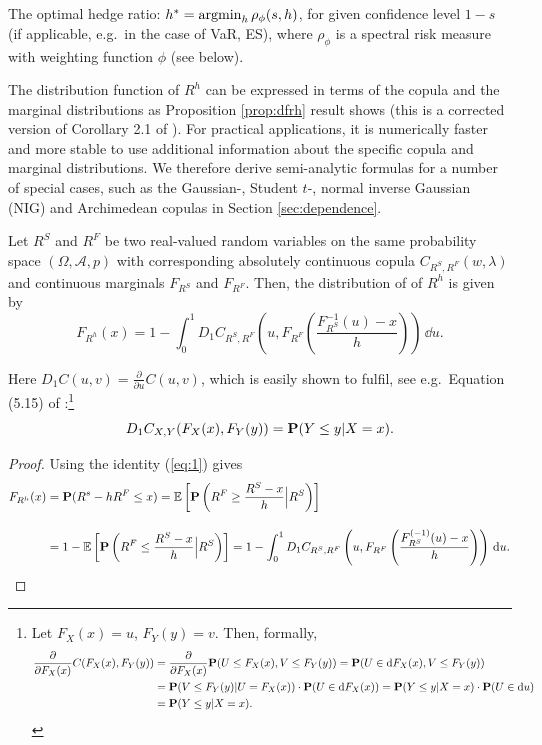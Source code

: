 \documentclass[11pt,a4paper,english]{article}
\begin{document}
The optimal hedge ratio: $h^\ast = \argmin_h \rho_\phi(s,h)$, for given
confidence level $1-s$ (if applicable, e.g.\ in the case of VaR, ES),
where $\rho_\phi$ is a spectral risk measure with weighting function
$\phi$ (see below).

The distribution function of $R^h$ can be expressed in terms of the
copula and the marginal distributions as Proposition \ref{prop:dfrh}
result shows (this is a corrected version of Corollary 2.1 of
\citep{Barbi2014}). For practical applications, it is numerically
faster and more stable to use additional information about the
specific copula and marginal distributions. We therefore derive
semi-analytic formulas for a number of special cases, such as the
Gaussian-, Student $t$-, normal inverse Gaussian (NIG) and Archimedean
copulas in Section \ref{sec:dependence}.

\begin{proposition}
  \label{prop:dfrh}
  Let $R^S$ and $R^F$ be two real-valued random variables on the same
  probability space $(\Omega, \mathcal A, p)$ with corresponding
  absolutely continuous copula $C_{R^S, R^F}(w,\lambda)$ and
  continuous marginals $F_{R^S}$ and $F_{R^F}$. Then, the distribution
  of of $R^h$ is given by
  \begin{equation}
    \label{eq:3}
    F_{R^h}(x) = 1- \int^1_0 D_1 C_{R^S, R^F}
    \left( u, F_{R^F} \left( \frac{F^{-1}_{R^S}(u)-x}{h} \right)
    \right)\, \dd u.
  \end{equation}
\end{proposition}\medskip
Here $D_1 C(u,v)=\displaystyle \frac{\partial}{\partial u} C(u,v)$,
which is easily shown to fulfil, see e.g.\ Equation (5.15) of
\citep{McNeil2005}:\footnote{%
  Let $F_X(x)=u$, $F_Y(y)=v$. Then, formally,
  \begin{align*}
    \frac{\partial}{\partial F_X(x)} C(F_X(x), F_Y(y)) %
    &= \frac{\partial}{\partial F_X(x)} \p(U\leq F_X(x),
      V\leq F_Y(y)) %
      = \p(U\in \dd F_X(x), V\leq F_Y(y))\\ %
    &= \p(V\leq F_Y(y)| U = F_X(x))\cdot \p(U \in \dd
      F_X(x)) %
      = \p(Y\leq y|X=x)\cdot \p(U\in \dd u)\\ %
    &= \p(Y\leq y|X=x).
  \end{align*}}
\begin{equation}
  \label{eq:1}
  D_1 C_{X,Y}(F_X(x), F_Y(y)) = {\bf P}(Y\leq y|X=x).
\end{equation}
\begin{proof}
  Using the identity (\ref{eq:1}) gives
  \begin{align*}
    F_{R^h}(x) &= \p(R^s - h R^F\leq x) %
                 = \E\left[\p\left(R^F\geq \frac{R^S-x}{h}\Big|
                 R^S\right)\right]\\[10pt]
               &= 1-\E\left[\p\left(R^F\leq \frac{R^S-x}{h}\Big|
                 R^S\right)\right]%
               = 1- \int_0^1 D_1 C_{R^S, R^F}\left(u,
                 F_{R^F}\left(\frac{F^{(-1)}_{R^S}(u) -
                 x}{h}\right)\right)\, \dd u.
  \end{align*}
\end{proof}\medskip
\end{document}
